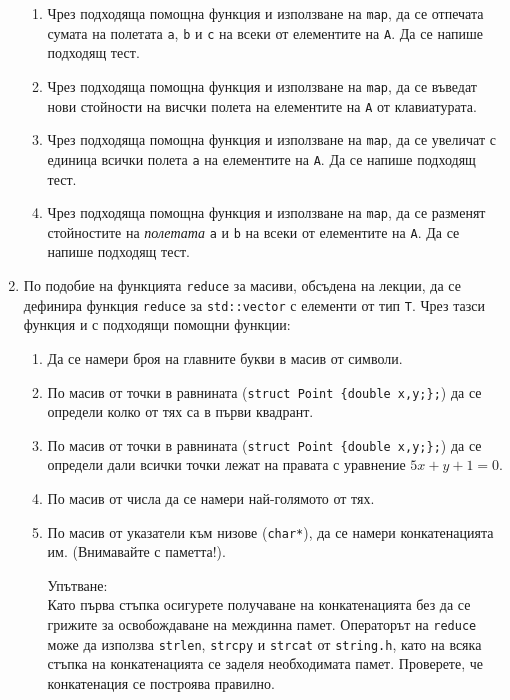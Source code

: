 \documentclass[12pt,a4paper]{article}
\begin{document}
\begin{enumerate}
\begin{enumerate}
	\item Чрез подходяща помощна функция и използване на \texttt{map}, да се отпечата сумата на полетата \texttt{a}, \texttt{b} и \texttt{c} на всеки от елементите на \texttt{A}. Да се напише подходящ тест.
	\item Чрез подходяща помощна функция и използване на \texttt{map}, да се въведат нови стойности на висчки полета на елементите на \texttt{A} от клавиатурата.
	\item Чрез подходяща помощна функция и използване на \texttt{map}, да се увеличат с единица всички полета \texttt{a} на елементите на \texttt{A}. Да се напише подходящ тест.
	\item Чрез подходяща помощна функция и използване на \texttt{map}, да се разменят стойностите на \emph{полетата} \texttt{a} и \texttt{b} на всеки от елементите на \texttt{A}. Да се напише подходящ тест.


\end{enumerate}

\item По подобие на функцията \texttt{reduce} за масиви, обсъдена на лекции, да се дефинира функция \texttt{reduce} за \texttt{std::vector} с елементи от тип \texttt{T}. Чрез тазси функция и с подходящи помощни функции:

	\begin{enumerate}
		\item Да се намери броя на главните букви в масив от символи.
		\item По масив от точки в равнината (\texttt{struct Point \{double x,y;\};}) да се определи колко от тях са в първи квадрант.
		\item По масив от точки в равнината (\texttt{struct Point \{double x,y;\};}) да се определи дали всички точки лежат на правата с уравнение $5x + y + 1 = 0$.
		\item По масив от числа да се намери най-голямото от тях.
		\item По масив от указатели към низове (\texttt{char*}), да се намери конкатенацията им. (Внимавайте с паметта!).
		\begin{mdframed}[hidealllines=true,backgroundcolor=gray!20]
		Упътване:\\

		Като първа стъпка осигурете получаване на конкатенацията без да се грижите за освобождаване на междинна памет. Операторът на \texttt{reduce} може да използва \texttt{strlen}, \texttt{strcpy} и \texttt{strcat} от \texttt{string.h}, като на всяка стъпка на конкатенацията се заделя необходимата памет. Проверете, че конкатенация се построява правилно.\\


\end{mdframed}
\end{enumerate}
\end{enumerate}
\end{document}
